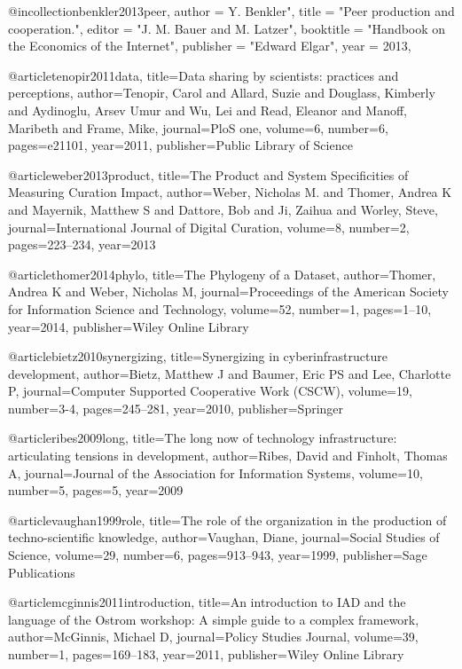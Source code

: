 @incollection{benkler2013peer,
  author      = Y. Benkler",
  title       = "Peer production and cooperation.",
  editor      = "J. M. Bauer and M. Latzer",
  booktitle   = "Handbook on the Economics of the Internet",
  publisher   = "Edward Elgar",
  year        = 2013,
}


@article{tenopir2011data,
  title={Data sharing by scientists: practices and perceptions},
  author={Tenopir, Carol and Allard, Suzie and Douglass, Kimberly and Aydinoglu, Arsev Umur and Wu, Lei and Read, Eleanor and Manoff, Maribeth and Frame, Mike},
  journal={PloS one},
  volume={6},
  number={6},
  pages={e21101},
  year={2011},
  publisher={Public Library of Science}
}


@article{weber2013product,
  title={The Product and System Specificities of Measuring Curation Impact},
  author={Weber, Nicholas M. and Thomer, Andrea K and Mayernik, Matthew S and Dattore, Bob and Ji, Zaihua and Worley, Steve},
  journal={International Journal of Digital Curation},
  volume={8},
  number={2},
  pages={223--234},
  year={2013}
}


@article{thomer2014phylo,
  title={The Phylogeny of a Dataset},
  author={Thomer, Andrea K and Weber, Nicholas M},
  journal={Proceedings of the American Society for Information Science and Technology},
  volume={52},
  number={1},
  pages={1--10},
  year={2014},
  publisher={Wiley Online Library}
}

@article{bietz2010synergizing,
  title={Synergizing in cyberinfrastructure development},
  author={Bietz, Matthew J and Baumer, Eric PS and Lee, Charlotte P},
  journal={Computer Supported Cooperative Work (CSCW)},
  volume={19},
  number={3-4},
  pages={245--281},
  year={2010},
  publisher={Springer}
}

@article{ribes2009long,
  title={The long now of technology infrastructure: articulating tensions in development},
  author={Ribes, David and Finholt, Thomas A},
  journal={Journal of the Association for Information Systems},
  volume={10},
  number={5},
  pages={5},
  year={2009}
}


@article{vaughan1999role,
  title={The role of the organization in the production of techno-scientific knowledge},
  author={Vaughan, Diane},
  journal={Social Studies of Science},
  volume={29},
  number={6},
  pages={913--943},
  year={1999},
  publisher={Sage Publications}
}

@article{mcginnis2011introduction,
  title={An introduction to IAD and the language of the Ostrom workshop: A simple guide to a complex framework},
  author={McGinnis, Michael D},
  journal={Policy Studies Journal},
  volume={39},
  number={1},
  pages={169--183},
  year={2011},
  publisher={Wiley Online Library}
}

